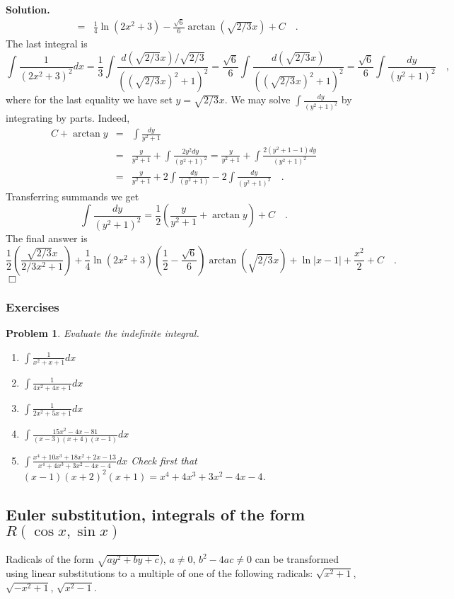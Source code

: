 \documentclass[12pt]{book}
\newenvironment{solution}{\textbf{Solution.} }{$\Box$}
\newtheorem{problem}{Problem}[section]
\begin{document}
\begin{solution}
\[\begin{array}{rcl}
&=&\frac{1}{4}\ln (2x^2+3)-\frac{\sqrt{6}}{6}\arctan (\sqrt{2/3}x)+C
\quad .
\end{array}
\]
The last integral is
\[
\int \frac{1}{(2x^2+3)^2}dx= \frac{1}3 \int \frac{d(\sqrt{2/3}x)/\sqrt{2/3}}{((\sqrt{2/3}x)^2+1)^2}= \frac{\sqrt{6}}{6}\int \frac{d(\sqrt{2/3}x)}{((\sqrt{2/3}x)^2+1)^2}= \frac{\sqrt{6}}{6}\int \frac{dy}{(y^2+1)^2}\quad,
\]
where for the last equality we have set $y=\sqrt{2/3}x$. We may solve $\int\frac{dy}{(y^2+1)^2}$ by integrating by parts. Indeed,
\[\begin{array}{rcl}
C+\arctan y &=& \int \frac{dy}{y^2+1}\\
&=& \frac{y}{y^2+1} +\int \frac{2y^2dy}{(y^2+1)^2}= \frac{y}{y^2+1}+\int \frac{2(y^2+1-1)dy}{(y^2+1)^2}\\
&=&\frac{y}{y^2+1} + 2\int \frac{dy}{(y^2+1)}- 2\int \frac{dy}{(y^2+1)^2}\quad.
\end{array}
\]
Transferring summands we get 
\[
\int \frac{dy}{(y^2+1)^2}= \frac{1}{2}\left(\frac{y}{y^2+1}+\arctan y\right) +C\quad .
\]
The final answer is 
\[
\frac{1}{2}\left(\frac{\sqrt{2/3}x}{2/3x^2+1}\right) +\frac{1}{4}\ln (2x^2+3)\left(\frac{1}2-\frac{\sqrt{6}}{6}\right)\arctan (\sqrt{2/3}x)+\ln|x-1|+\frac{x ^2}2+C\quad .
\]
\end{solution}
\subsubsection{Exercises}
\begin{problem}
Evaluate the indefinite integral. 
\begin{enumerate}
\item $\int \frac1{x^2+x+1}dx$
\item $\int \frac1{4x^2+4x+1}dx$
\item $\int \frac1{2x^2+5x+1}dx$
\item $\int \frac{15x^2-4x-81}{(x-3)(x+4)(x-1)}dx$
\item $\int \frac {x^{4}+10x^{3}+18x^{2}+2x-13}{x^{4}+4x^{3}+3x^{2}-4x-4}dx$ 
Check first that $(x-1)(x+2)^2(x+1)= x^{4}+4x^{3}+3x^{2}-4x-4$.
\end{enumerate}
\end{problem}
\subsection{Euler substitution, integrals of the form $R(\cos x, \sin x)$}\label{secEulerSubTrigIntegrals}
Radicals of the form  $\sqrt{ay^2+by+c})$, $a\neq 0$, $b^2-4ac\neq 0$ can be transformed using linear substitutions to a multiple of one of the following radicals: $\sqrt{x^2+1}$, $\sqrt{-x^2+1}$,  $\sqrt{x^2-1}$.
\end{document}
